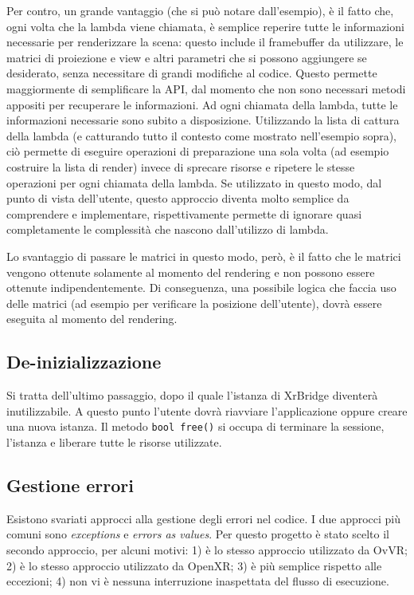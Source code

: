 \documentclass[twoside]{supsistudent}
\begin{document}
Per contro, un grande vantaggio (che si può notare dall'esempio), è il fatto che, ogni volta che la lambda viene chiamata, è semplice reperire tutte le informazioni necessarie per renderizzare la scena: questo include il framebuffer da utilizzare, le matrici di proiezione e view e altri parametri che si possono aggiungere se desiderato, senza necessitare di grandi modifiche al codice. Questo permette maggiormente di semplificare la API, dal momento che non sono necessari metodi appositi per recuperare le informazioni. Ad ogni chiamata della lambda, tutte le informazioni necessarie sono subito a disposizione. Utilizzando la lista di cattura della lambda (e catturando tutto il contesto come mostrato nell'esempio sopra), ciò permette di eseguire operazioni di preparazione una sola volta (ad esempio costruire la lista di render) invece di sprecare risorse e ripetere le stesse operazioni per ogni chiamata della lambda. Se utilizzato in questo modo, dal punto di vista dell'utente, questo approccio diventa molto semplice da comprendere e implementare, rispettivamente permette di ignorare quasi completamente le complessità che nascono dall'utilizzo di lambda.

Lo svantaggio di passare le matrici in questo modo, però, è il fatto che le matrici vengono ottenute solamente al momento del rendering e non possono essere ottenute indipendentemente. Di conseguenza, una possibile logica che faccia uso delle matrici (ad esempio per verificare la posizione dell'utente), dovrà essere eseguita al momento del rendering.

\subsection{De-inizializzazione}

Si tratta dell'ultimo passaggio, dopo il quale l'istanza di XrBridge diventerà inutilizzabile. A questo punto l'utente dovrà riavviare l'applicazione oppure creare una nuova istanza. Il metodo \texttt{bool free()} si occupa di terminare la sessione, l'istanza e liberare tutte le risorse utilizzate.

\subsection{Gestione errori}

Esistono svariati approcci alla gestione degli errori nel codice. I due approcci più comuni sono \textit{exceptions} e \textit{errors as values}. Per questo progetto è stato scelto il secondo approccio, per alcuni motivi: 1) è lo stesso approccio utilizzato da OvVR; 2) è lo stesso approccio utilizzato da OpenXR; 3) è più semplice rispetto alle eccezioni; 4) non vi è nessuna interruzione inaspettata del flusso di esecuzione.
\end{document}
